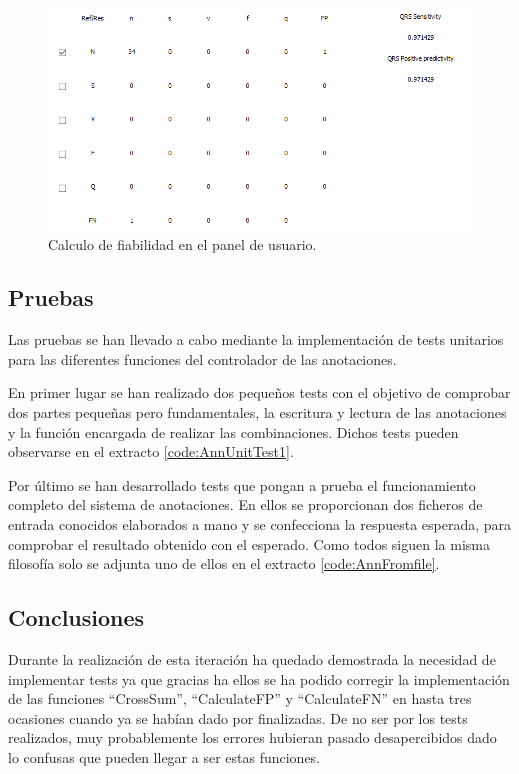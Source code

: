     \begin{figure}[H]
            \centering
                    \includegraphics[width = \linewidth]{figuras/fiabilidad.PNG}
            \caption{Calculo de fiabilidad en el panel de usuario.}
            \label{fig:fiability}
    \end{figure}
        
    \subsection{Pruebas}
    
    Las pruebas se han llevado a cabo mediante la implementación de tests unitarios para las diferentes funciones del controlador de las anotaciones. 
    
    En primer lugar se han realizado dos pequeños tests con el objetivo de comprobar dos partes pequeñas pero fundamentales, la escritura y lectura de las anotaciones y la función encargada de realizar las combinaciones. Dichos tests pueden observarse en el extracto \ref{code:AnnUnitTest1}.
    
    
    Por último se han desarrollado tests que pongan a prueba el funcionamiento completo del sistema de anotaciones. En ellos se proporcionan dos ficheros de entrada conocidos elaborados a mano y se confecciona la respuesta esperada, para comprobar el resultado obtenido con el esperado. Como todos siguen la misma filosofía solo se adjunta uno de ellos en el extracto \ref{code:AnnFromfile}.
    
    
    \subsection{Conclusiones}
    
    Durante la realización de esta iteración ha quedado demostrada la necesidad de implementar tests ya que gracias ha ellos se ha podido corregir la implementación de las funciones ``CrossSum'', ``CalculateFP'' y ``CalculateFN'' en hasta tres ocasiones cuando ya se habían dado por finalizadas. De no ser por los tests realizados, muy probablemente los errores hubieran pasado desapercibidos dado lo confusas que pueden llegar a ser estas funciones.